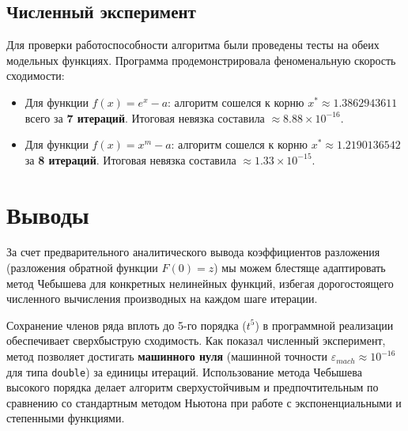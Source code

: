 \documentclass[12pt, a4paper]{article}
\theoremstyle{definition}
\begin{document}
\subsection{Численный эксперимент}
Для проверки работоспособности алгоритма были проведены тесты на обеих модельных функциях. Программа продемонстрировала феноменальную скорость сходимости:
\begin{itemize}
    \item Для функции $f(x) = e^x - a$: алгоритм сошелся к корню $x^* \approx 1.3862943611$ всего за \textbf{7 итераций}. Итоговая невязка составила $\approx 8.88 \times 10^{-16}$.
    \item Для функции $f(x) = x^m - a$: алгоритм сошелся к корню $x^* \approx 1.2190136542$ за \textbf{8 итераций}. Итоговая невязка составила $\approx 1.33 \times 10^{-15}$.
\end{itemize}

\section{Выводы}
За счет предварительного аналитического вывода коэффициентов разложения (разложения обратной функции $F(0)=z$) мы можем блестяще адаптировать метод Чебышева для конкретных нелинейных функций, избегая дорогостоящего численного вычисления производных на каждом шаге итерации. 

Сохранение членов ряда вплоть до 5-го порядка ($t^5$) в программной реализации обеспечивает сверхбыструю сходимость. Как показал численный эксперимент, метод позволяет достигать \textbf{машинного нуля} (машинной точности $\varepsilon_{mach} \approx 10^{-16}$ для типа \texttt{double}) за единицы итераций. Использование метода Чебышева высокого порядка делает алгоритм сверхустойчивым и предпочтительным по сравнению со стандартным методом Ньютона при работе с экспоненциальными и степенными функциями.
\end{document}
